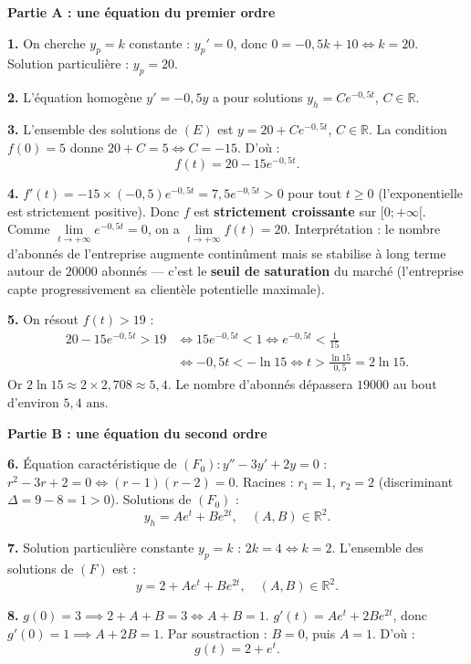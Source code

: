 \documentclass[11pt]{article}
\begin{document}
\begin{corrige}
\textbf{Partie A : une équation du premier ordre}

\textbf{1.} On cherche $y_p = k$ constante : $y_p' = 0$, donc $0 = -0{,}5k + 10 \iff k = 20$. Solution particulière : $\boxed{y_p = 20}$.

\textbf{2.} L'équation homogène $y' = -0{,}5y$ a pour solutions $y_h = Ce^{-0{,}5t}$, $C \in \mathbb{R}$.

\textbf{3.} L'ensemble des solutions de $(E)$ est $y = 20 + Ce^{-0{,}5t}$, $C \in \mathbb{R}$.
La condition $f(0) = 5$ donne $20 + C = 5 \iff C = -15$. D'où :
\[ \boxed{f(t) = 20 - 15e^{-0{,}5t}.} \]

\textbf{4.} $f'(t) = -15 \times (-0{,}5)e^{-0{,}5t} = 7{,}5e^{-0{,}5t} > 0$ pour tout $t \geq 0$ (l'exponentielle est strictement positive). Donc $f$ est \textbf{strictement croissante} sur $[0 ; +\infty[$.
Comme $\lim\limits_{t \to +\infty} e^{-0{,}5t} = 0$, on a $\boxed{\lim\limits_{t \to +\infty} f(t) = 20}$.
Interprétation : le nombre d'abonnés de l'entreprise augmente continûment mais se stabilise à long terme autour de $\num{20000}$ abonnés — c'est le \textbf{seuil de saturation} du marché (l'entreprise capte progressivement sa clientèle potentielle maximale).

\textbf{5.} On résout $f(t) > 19$ :
\begin{align*}
20 - 15e^{-0{,}5t} > 19 &\iff 15e^{-0{,}5t} < 1 \iff e^{-0{,}5t} < \frac{1}{15}\\
&\iff -0{,}5t < -\ln 15 \iff t > \frac{\ln 15}{0{,}5} = 2\ln 15.
\end{align*}
Or $2\ln 15 \approx 2 \times 2{,}708 \approx 5{,}4$. Le nombre d'abonnés dépassera $\num{19000}$ au bout d'environ $\boxed{5{,}4 \text{ ans}}$.

\textbf{Partie B : une équation du second ordre}

\textbf{6.} Équation caractéristique de $(F_0) : y'' - 3y' + 2y = 0$ : $r^2 - 3r + 2 = 0 \iff (r-1)(r-2) = 0$. Racines : $r_1 = 1$, $r_2 = 2$ (discriminant $\Delta = 9 - 8 = 1 > 0$). Solutions de $(F_0)$ :
\[ y_h = Ae^{t} + Be^{2t},\quad (A,B) \in \mathbb{R}^2. \]

\textbf{7.} Solution particulière constante $y_p = k$ : $2k = 4 \iff k = 2$. L'ensemble des solutions de $(F)$ est :
\[ \boxed{y = 2 + Ae^{t} + Be^{2t},\quad (A,B) \in \mathbb{R}^2.} \]

\textbf{8.} $g(0) = 3 \implies 2 + A + B = 3 \iff A + B = 1$.
$g'(t) = Ae^{t} + 2Be^{2t}$, donc $g'(0) = 1 \implies A + 2B = 1$.
Par soustraction : $B = 0$, puis $A = 1$. D'où :
\[ \boxed{g(t) = 2 + e^{t}.} \]


\end{corrige}
\end{document}
